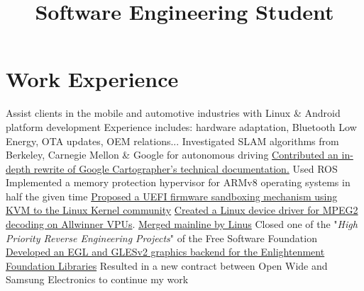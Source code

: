 \documentclass[11pt,a4paper,sans]{moderncv}
\title{Software Engineering Student}
\begin{document}
\makecvtitle

\section{Work Experience}
{\listitemsymbol Assist clients in the mobile and automotive industries with Linux \& Android platform development
 \listitemsymbol Experience includes: hardware adaptation, Bluetooth Low Energy, OTA updates, OEM relations...}
{\listitemsymbol Investigated SLAM algorithms from Berkeley, Carnegie Mellon \& Google for autonomous driving 
\listitemsymbol \href{https://github.com/googlecartographer/cartographer_ros/pull/952}{Contributed an in-depth rewrite of Google Cartographer's technical documentation.} Used ROS}
{\listitemsymbol Implemented a memory protection hypervisor for ARMv8 operating systems in half the given time
 \listitemsymbol \href{https://www.mail-archive.com/linux-efi@vger.kernel.org/msg08584.html}{Proposed a UEFI firmware sandboxing mechanism using KVM to the Linux Kernel community}}
{\listitemsymbol \href{https://www.mail-archive.com/linux-media@vger.kernel.org/msg101816.html}{Created a Linux device driver for MPEG2 decoding on Allwinner VPUs}. \href{https://git.kernel.org/pub/scm/linux/kernel/git/torvalds/linux.git/tree/drivers/staging/media/sunxi/cedrus}{Merged mainline by Linus}
 \listitemsymbol Closed one of the "\textit{High Priority Reverse Engineering Projects}" of the Free Software Foundation}
{\listitemsymbol \href{https://www.mail-archive.com/enlightenment-devel@lists.sourceforge.net/msg78664.html}{Developed an EGL and GLESv2 graphics backend for the Enlightenment Foundation Libraries}
 \listitemsymbol Resulted in a new contract between Open Wide and Samsung Electronics to continue my work}
\end{document}
